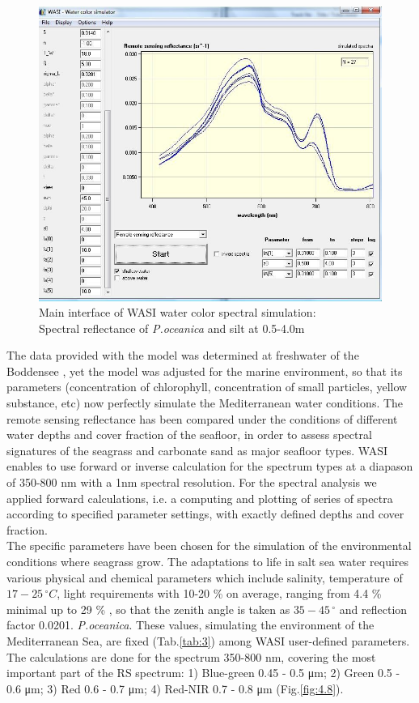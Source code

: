 \documentclass[10pt, a4paper]{article}
\begin{document}
\begin{figure}[h]
	\centering
	\includegraphics[scale=0.30]{Fig-30.jpg}
	\caption{Main interface of WASI water color spectral simulation: \\ Spectral reflectance of \textit{P.oceanica} and silt at 0.5-4.0m}
	\label{fig:4.7}
\end{figure}

The data provided with the model was determined at freshwater of the Boddensee \cite{Gege05}\label{Gege05}, 
yet the model was adjusted for the marine environment, so that its parameters (concentration of chlorophyll, concentration of small particles,
yellow substance, etc) now perfectly simulate the Mediterranean water conditions.
The remote sensing reflectance has been compared under the conditions of different water depths and
cover fraction of the seafloor, in order to assess spectral signatures of the seagrass and carbonate sand
as major seafloor types. WASI enables to use forward or inverse calculation for the spectrum types at
a diapason of 350-800 nm with a 1nm spectral resolution. For the spectral analysis we applied
forward calculations, i.e. a computing and plotting of series of spectra according to specified
parameter settings, with exactly defined depths and cover fraction. \\
The specific parameters have been chosen for the simulation of the environmental conditions where seagrass
grow. The adaptations to life in salt sea water requires various physical and chemical parameters
which include salinity, temperature of $17-25\,^{\circ}C$, light requirements with 10-20 \% on average, ranging
from 4.4 \%  minimal up to 29 \% \cite{McKenzie09}\label{McKenzie09}, so that the zenith angle is taken as $35-45\,^{\circ}$
and reflection factor 0.0201. \textit{P.oceanica}. These values, simulating the environment of the Mediterranean Sea, are fixed (Tab.\ref{tab:3}) among WASI user-defined parameters.
The calculations are done for the spectrum 350-800 nm, covering the most important part of the RS spectrum: 1) Blue-green 0.45 - 0.5 μm; 2) Green 0.5 - 0.6 μm; 3) Red 0.6 - 0.7 μm; 4) Red-NIR 0.7 - 0.8 μm (Fig.\ref{fig:4.8}).
\end{document}
